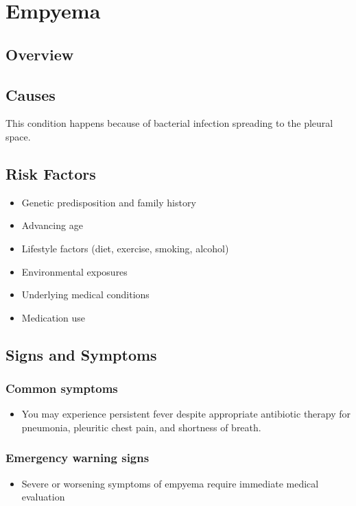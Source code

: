 \chapter{Empyema}
\label{sec:Empyema}

\section{Overview}

\section{Causes}
This condition happens because of bacterial infection spreading to the pleural space.     
\section{Risk Factors}

\begin{itemize}[noitemsep]
  \item Genetic predisposition and family history
  \item Advancing age
  \item Lifestyle factors (diet, exercise, smoking, alcohol)
  \item Environmental exposures
  \item Underlying medical conditions
  \item Medication use
\end{itemize}
\section{Signs and Symptoms}

\subsection{Common symptoms}
\begin{itemize}[noitemsep]
  \item You may experience persistent fever despite appropriate antibiotic therapy for pneumonia, pleuritic chest pain, and shortness of breath. 
  \end{itemize}

\subsection{Emergency warning signs}
\begin{itemize}[noitemsep]
  \item Severe or worsening symptoms of empyema require immediate medical evaluation
\end{itemize}
